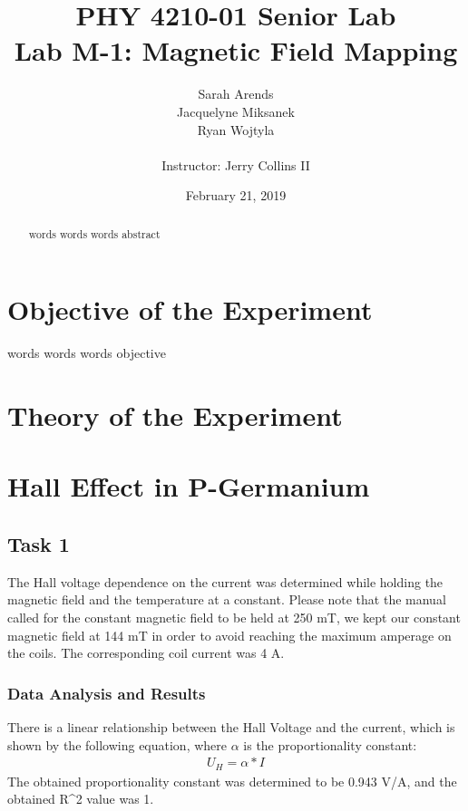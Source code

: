 \documentclass[a4paper]{article}
\title{PHY 4210-01 Senior Lab \\Lab M-1: Magnetic Field Mapping}
\author{Sarah Arends \\ 
        Jacquelyne Miksanek \\
        Ryan Wojtyla \\ \\
        Instructor: Jerry Collins II}
\date{February 21, 2019}
\begin{document}
\maketitle 

\begin{abstract}
\qq words words words abstract
\end{abstract}

\newpage

\tableofcontents

\newpage

\section{Objective of the Experiment}
\qq words words words objective

\section{Theory of the Experiment}


\section{Hall Effect in P-Germanium}

\subsection{Task 1}

\qq The Hall voltage dependence on the current was determined while
holding the magnetic field and the temperature at a constant. Please
note that the manual called for the constant magnetic field to be held
at 250 mT, we kept our constant magnetic field at 144 mT in order to
avoid reaching the maximum amperage on the coils. The corresponding
coil current was 4 A.

\subsubsection{Data Analysis and Results}
There is a linear relationship between the Hall Voltage and the
current, which is shown by the following equation, where $\alpha$ is
the proportionality constant:
\begin{align*}
U_H = \alpha * I
\end{align*}
The obtained proportionality constant was determined to be 0.943 V/A,
and the obtained R^2 value was 1.
\end{document}
